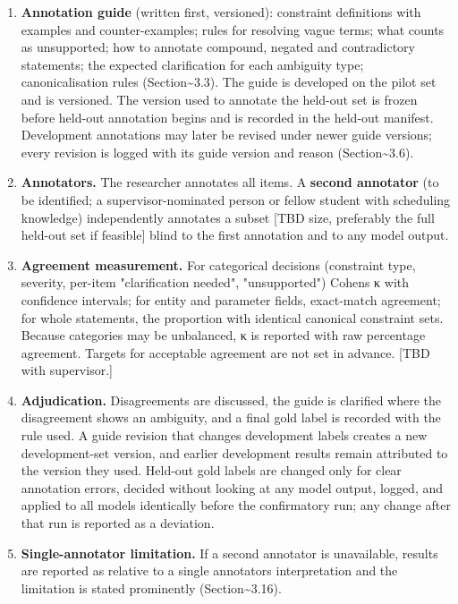 \documentclass[
  11pt,a4paper,oneside]{report}
\providecommand{\tightlist}{%
  \setlength{\itemsep}{0pt}\setlength{\parskip}{0pt}}
\begin{document}
\begin{enumerate}
\def\labelenumi{\arabic{enumi}.}
\tightlist
\item
  \textbf{Annotation guide} (written first, versioned): constraint
  definitions with examples and counter-examples; rules for resolving
  vague terms; what counts as unsupported; how to annotate compound,
  negated and contradictory statements; the expected clarification for
  each ambiguity type; canonicalisation rules
  (Section\textasciitilde3.3). The guide is developed on the pilot set
  and is versioned. The version used to annotate the held-out set is
  frozen before held-out annotation begins and is recorded in the
  held-out manifest. Development annotations may later be revised under
  newer guide versions; every revision is logged with its guide version
  and reason (Section\textasciitilde3.6).
\item
  \textbf{Annotators.} The researcher annotates all items. A
  \textbf{second annotator} (to be identified; a supervisor-nominated
  person or fellow student with scheduling knowledge) independently
  annotates a subset {[}TBD size, preferably the full held-out set if
  feasible{]} blind to the first annotation and to any model output.
\item
  \textbf{Agreement measurement.} For categorical decisions (constraint
  type, severity, per-item "clarification needed", "unsupported")
  Cohen\textquotesingle s κ with confidence intervals; for entity and
  parameter fields, exact-match agreement; for whole statements, the
  proportion with identical canonical constraint sets. Because
  categories may be unbalanced, κ is reported with raw percentage
  agreement. Targets for acceptable agreement are not set in advance.
  {[}TBD with supervisor.{]}
\item
  \textbf{Adjudication.} Disagreements are discussed, the guide is
  clarified where the disagreement shows an ambiguity, and a final gold
  label is recorded with the rule used. A guide revision that changes
  development labels creates a new development-set version, and earlier
  development results remain attributed to the version they used.
  Held-out gold labels are changed only for clear annotation errors,
  decided without looking at any model output, logged, and applied to
  all models identically before the confirmatory run; any change after
  that run is reported as a deviation.
\item
  \textbf{Single-annotator limitation.} If a second annotator is
  unavailable, results are reported as relative to a single
  annotator\textquotesingle s interpretation and the limitation is
  stated prominently (Section\textasciitilde3.16).
\end{enumerate}
\end{document}
